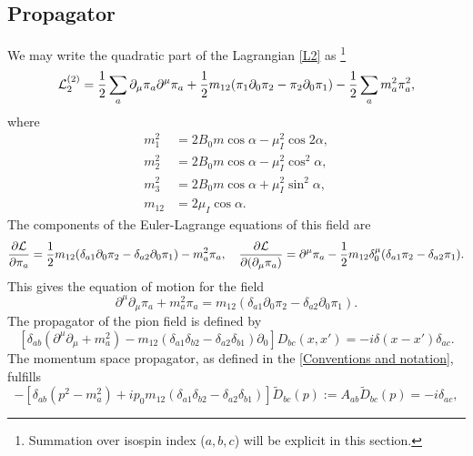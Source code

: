 \subsection{Propagator}
\label{section:propagator}
We may write the quadratic part of the Lagrangian \autoref{L2} as \footnote{Summation over isospin index ($a,b,c$) will be explicit in this section.}
\begin{align}
    \label{quadratic lagrangian}
    \mathcal{L}_2^{(2)}
    =
    \frac{1}{2} \sum_a \partial_\mu \pi_a \partial^\mu \pi_a
    + \frac{1}{2} m_{12} (\pi_1 \partial_0 \pi_2 - \pi_2 \partial_0 \pi_1)
    - \frac{1}{2} \sum_a m_a^2 \pi_a^2,
\end{align}
where
\begin{align}
    m_1^2 &= 2 B_0 m \cos{\alpha} - \mu_I^2 \cos{2\alpha}, \\
    m_2^2 &= 2 B_0 m \cos{\alpha} - \mu_I^2 \cos^2{\alpha}, \\
    m_3^2 &= 2 B_0 m \cos{\alpha} + \mu_I^2 \sin^2{\alpha}, \\
    m_{12} &= 2 \mu_I \cos{\alpha}.
\end{align}
The components of the Euler-Lagrange equations of this field are
\begin{equation*}
    \pdv{\mathcal{L}}{\pi_a} = 
    \frac{1}{2} m_{12} (\delta_{a1} \partial_0 \pi_2 - \delta_{a2}\partial_0 \pi_1) 
    - m^2_{a} \pi_a, \quad
    \pdv{\mathcal{L}}{(\partial_\mu \pi_a)} = 
    \partial^\mu \pi_a - \frac{1}{2} m_{12} \delta^\mu_0 (\delta_{a1}\pi_2  - \delta_{a2}\pi_1).
\end{equation*}
This gives the equation of motion for the field
\begin{equation}
    \partial^\mu \partial_\mu \pi_a + m_a^2 \pi_a
    =  m_{12}(\delta_{a1} \partial_0 \pi_2  - \delta_{a2} \partial_0 \pi_1).
\end{equation}
The propagator of the pion field is defined by
\begin{equation}
    \left[
        \delta_{ab}(\partial^\mu\partial_\mu + m^2_a)
        -  m_{12}(\delta_{a1} \delta_{b2} - \delta_{a2}\delta_{b1}) \partial_0
    \right] 
    D_{bc}(x, x') 
    = -i \delta(x - x') \delta_{ac}.
\end{equation}
The momentum space propagator, as defined in the \autoref{Conventions and notation}, fulfills
\begin{equation*}
    -\left[
        \delta_{ab}(p^2 - m_a^2)
        +  i p_0 m_{12}(\delta_{a1} \delta_{b2} - \delta_{a2}\delta_{b1}) 
    \right] 
    \tilde D_{bc}(p) 
    := A_{ab} \tilde D_{bc}(p) = -i \delta_{ac},
\end{equation*}
